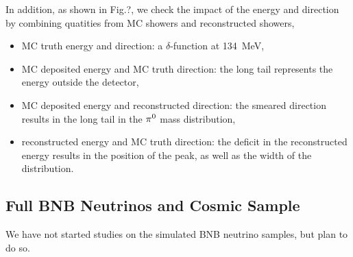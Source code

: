 In addition, as shown in Fig.?,
we check the impact of the energy and direction by
combining quatities from MC showers
and reconstructed showers,
\begin{itemize}
\item MC truth energy and direction: a $\delta$-function at 134~MeV,
\item MC deposited energy and MC truth direction: the long tail
      represents the energy outside the detector,
\item MC deposited energy and reconstructed direction: the smeared
      direction results in the long tail in the ${\pi}^0$ mass distribution,
\item reconstructed energy and MC truth direction: the deficit in
      the reconstructed energy results in the position of the peak,
      as well as the width of the distribution.
\end{itemize}

\subsection{Full BNB Neutrinos and Cosmic Sample}
\label{sec:bnb}

We have not started studies on the simulated BNB neutrino samples,
but plan to do so.



